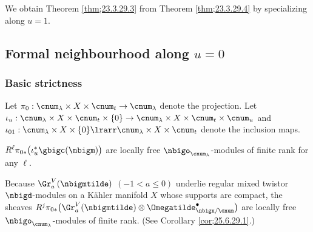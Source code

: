 \documentclass[a4,10pt]{article}
\begin{document}
We obtain Theorem \ref{thm;23.3.29.3}
from Theorem \ref{thm;23.3.29.4}
by specializing along $u=1$.

\subsection{Formal neighbourhood along $u=0$}
\subsubsection{Basic strictness}

Let $\pi_0:\cnum_{\lambda}\times X\times\cnum_t\to \cnum_{\lambda}$
denote the projection.
Let $\iota_{u}:\cnum_{\lambda}\times X\times\cnum_t\times\{0\}\to
\cnum_{\lambda}\times X\times\cnum_t\times\cnum_u$
and
$\iota_{01}:\cnum_{\lambda}\times X\times\{0\}
 \lrarr
\cnum_{\lambda}\times X\times\cnum_t$
denote the inclusion maps.

\begin{lem}
\label{lem;23.3.29.10}
$R^{\ell}\pi_{0\ast}\bigl(
\iota_{u}^{\ast}\gbigc(\nbigm)
\bigr)$ are locally free
$\nbigo_{\cnum_{\lambda}}$-modules of finite rank
for any $\ell$.
\end{lem}
\pf
Because $\Gr^{V}_a(\nbigmtilde)$ $(-1<a\leq 0)$
underlie regular mixed twistor $\nbigd$-modules
on a K\"ahler manifold $X$
whose supports are compact,
the sheaves
$R^j\pi_{0\ast}\bigl(
\Gr^{V}_a(\nbigmtilde)
\otimes
\Omegatilde^{\bullet}_{\nbigx/\cnum}
\bigr)$
are locally free $\nbigo_{\cnum_{\lambda}}$-modules
of finite rank.
(See Corollary \ref{cor;25.6.29.1}.)
\end{document}
